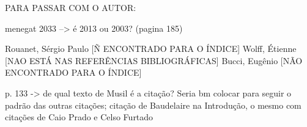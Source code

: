 PARA PASSAR COM O AUTOR:

menegat 2033 --> é 2013 ou 2003? (pagina 185)

Rouanet, Sérgio Paulo [Ñ ENCONTRADO PARA O ÍNDICE]
Wolff, Étienne [NAO ESTÁ NAS REFERÊNCIAS BIBLIOGRÁFICAS]
Bucci, Eugênio [NÃO ENCONTRADO PARA O ÍNDICE]

p. 133 -> de qual texto de Musil é a citação? Seria bm colocar para seguir o padrão das outras citações; citação de Baudelaire na Introdução, o mesmo com citações de Caio Prado e Celso Furtado